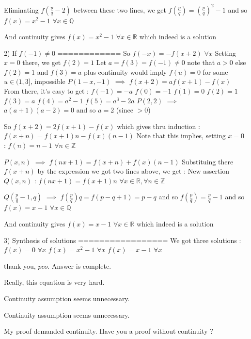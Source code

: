 \begin{solution}
Eliminating $f(\frac pq-2)$ between these two lines, we get $f(\frac pq)=\left(\frac pq\right)^2-1$ and so $f(x)=x^2-1$ $\forall x\in\mathbb Q$

And continuity gives $f(x)=x^2-1$ $\forall x\in\mathbb R$ which indeed is a solution 

2) If $f(-1)\ne 0$ 
============
So $f(-x)=-f(x+2)$ $\forall x$
Setting $x=0$ there, we get $f(2)=1$
Let $a=f(3)=f(-1)\ne 0$ note that $a>0$ else $f(2)=1$ and $f(3)=a$ plus continuity would imply $f(u)=0$ for some $u\in(1,3]$, impossible
$P(1-x,-1)$ $\implies$ $f(x+2)=af(x+1)-f(x)$
From there, it's easy to get :
$f(-1)=-a$
$f(0)=-1$
$f(1)=0$
$f(2)=1$
$f(3)=a$
$f(4)=a^2-1$
$f(5)=a^3-2a$
$P(2,2)$ $\implies$  $a(a+1)(a-2)=0$ and so $a=2$ (since $>0$)

So $f(x+2)=2f(x+1)-f(x)$ which gives thru induction : $f(x+n)=f(x+1)n-f(x)(n-1)$
Note that this implies, setting $x=0$ : $f(n)=n-1$ $\forall n\in\mathbb Z$

$P(x,n)$ $\implies$ $f(nx+1)=f(x+n)+f(x)(n-1)$
Substituing there $f(x+n)$ by the expression we got two lines above, we get :
New assertion $Q(x,n)$ : $f(nx+1)=f(x+1)n$ $\forall x\in\mathbb R,\forall n\in\mathbb Z$


$Q(\frac pq-1,q)$ $\implies$ $f(\frac pq)q=f(p-q+1)=p-q$ and so $f(\frac pq)=\frac pq-1$ and so $f(x)=x-1$ $\forall x\in\mathbb Q$

And continuity gives $f(x)=x-1$ $\forall x\in\mathbb R$ which indeed is a solution 

3) Synthesis of solutions
=================
We got three solutions :
$f(x)=0$ $\forall x$
$f(x)=x^2-1$ $\forall x$
$f(x)=x-1$ $\forall x$
\end{solution}



\begin{solution}
	thank you, $pco$.
Answer is complete.

Really,  this  equation  is very hard.
\end{solution}



\begin{solution}
	Continuity assumption seems unnecessary.
\end{solution}



\begin{solution}
	\begin{tcolorbox}Continuity assumption seems unnecessary.\end{tcolorbox}
My proof demanded continuity.
Have you a proof without continuity ?
\end{solution}



